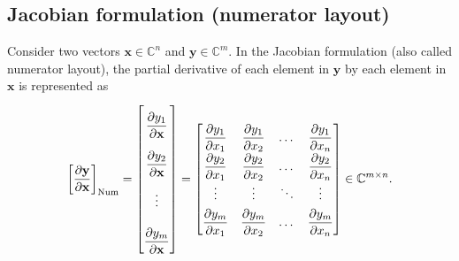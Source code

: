 \documentclass{article}
\begin{document}
\subsection{Jacobian formulation (numerator layout)}

Consider two vectors \(\mathbf{x} \in \mathbb{C}^n\) and \(\mathbf{y} \in \mathbb{C}^m\). In the Jacobian formulation (also called numerator layout), the partial derivative of each element in \(\mathbf{y}\) by each element in \(\mathbf{x}\) is represented as
\begin{align}
    \label{eq:jacobian-formulation}
    \left[ \dfrac{\partial \mathbf{y}}{\partial \mathbf{x}} \right]_{\textnormal{Num}} = \renewcommand{\arraystretch}{2.6} \begin{bmatrix}
        \dfrac{\partial y_1}{\partial \mathbf{x}} \\
        \dfrac{\partial y_2}{\partial \mathbf{x}} \\ 
        \vdots \\ 
        \dfrac{\partial y_m}{\partial \mathbf{x}}
    \end{bmatrix} = \renewcommand{\arraystretch}{1.8}
    \begin{bmatrix}
        \dfrac{\partial y_1}{\partial x_1} & \dfrac{\partial y_1}{\partial x_2} & \dots & \dfrac{\partial y_1}{\partial x_n} \\
        \dfrac{\partial y_2}{\partial x_1} & \dfrac{\partial y_2}{\partial x_2} & \dots & \dfrac{\partial y_2}{\partial x_n} \\
        \vdots & \vdots & \ddots & \vdots \\
        \dfrac{\partial y_m}{\partial x_1} & \dfrac{\partial y_m}{\partial x_2} & \dots & \dfrac{\partial y_m}{\partial x_n} \\
    \end{bmatrix} \in \mathbb{C}^{m\times n}.
\end{align}
\end{document}
